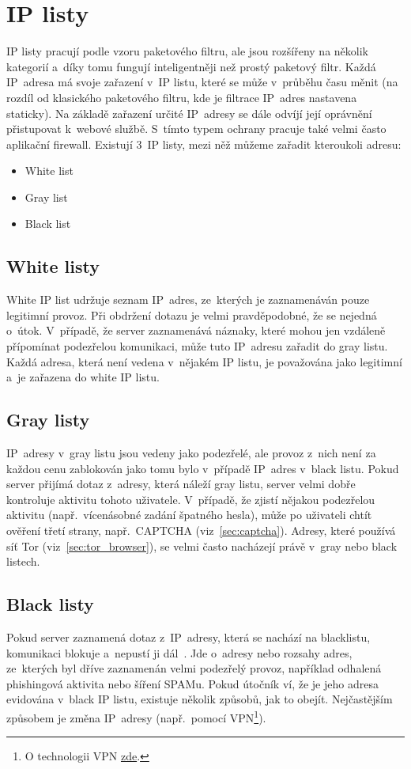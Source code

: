 \section{IP listy}
\label{sec:ip_lists}
IP listy pracují podle vzoru paketového filtru, ale jsou rozšířeny na několik kategorií a~díky tomu fungují inteligentněji než prostý paketový filtr. Každá IP~adresa má svoje zařazení v~IP listu, které se může v~průběhu času měnit (na rozdíl od klasického paketového filtru, kde je filtrace IP~adres nastavena staticky). Na základě zařazení určité IP~adresy se dále odvíjí její oprávnění přistupovat k~webové službě. S~tímto typem ochrany pracuje také velmi často aplikační firewall. Existují 3~IP listy, mezi něž můžeme zařadit kteroukoli adresu:
\begin{itemize}
	\item White list
	\item Gray list
	\item Black list
\end{itemize}

\subsection*{White listy}
White IP list udržuje seznam IP~adres, ze~kterých je zaznamenáván pouze legitimní provoz. Při obdržení dotazu je velmi pravděpodobné, že se nejedná o~útok. V~případě, že server zaznamenává náznaky, které mohou jen vzdáleně přípomínat podezřelou komunikaci, může tuto IP~adresu zařadit do gray listu. Každá adresa, která není vedena v~nějakém IP listu, je považována jako legitimní a~je zařazena do white IP listu.

\subsection*{Gray listy}
\label{sec:gray_list}
IP~adresy v~gray listu jsou vedeny jako podezřelé, ale provoz z~nich není za každou cenu zablokován jako tomu bylo v~případě IP~adres v~black listu. Pokud server přijímá dotaz z~adresy, která náleží gray listu, server velmi dobře kontroluje aktivitu tohoto uživatele. V~případě, že zjistí nějakou podezřelou aktivitu (např.~vícenásobné zadání špatného hesla), může po uživateli chtít ověření třetí strany, např.~CAPTCHA (viz~\ref{sec:captcha}). Adresy, které používá síť Tor (viz~\ref{sec:tor_browser}), se velmi často nacházejí právě v~gray nebo black listech.

\subsection*{Black listy}
Pokud server zaznamená dotaz z~IP~adresy, která se nachází na blacklistu, komunikaci blokuje a~nepustí ji dál~\cite{bib:black_list}. Jde o~adresy nebo rozsahy adres, ze~kterých byl dříve zaznamenán velmi podezřelý provoz, například odhalená phishingová aktivita nebo šíření SPAMu. Pokud útočník ví, že je jeho adresa evidována v~black IP listu, existuje několik způsobů, jak to obejít. Nejčastějším způsobem je změna IP~adresy (např.~pomocí VPN\footnote{O technologii VPN \href{https://blog.avast.com/cs/co-je-vpn-a-jak-funguje}{zde}.}).

